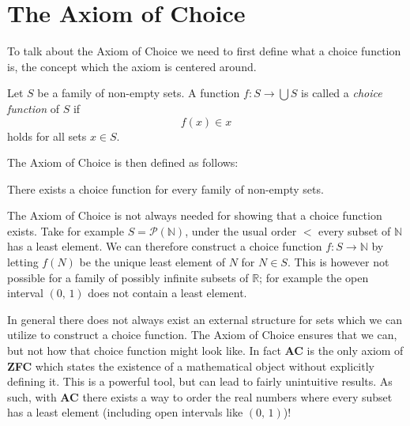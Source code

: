 \documentclass[../../main.tex]{subfiles}
\begin{document}
\section{The Axiom of Choice}
To talk about the Axiom of Choice we need to first define what a choice function is, the concept which the axiom is centered around.
\begin{definition}\cite[p.38]{Jec78}
    Let $S$ be a family of non-empty sets.
    A function $f: S \to \bigcup S$ is called a \textit{choice function} of $S$ if
    $$f(x) \in x$$
    holds for all sets $x \in S$.
\end{definition}
The Axiom of Choice is then defined as follows:
\begin{definition}\cite[p.38]{Jec78}\label{choice-axiom}
    There exists a choice function for every family of non-empty sets.
\end{definition}

The Axiom of Choice is not always needed for showing that a choice function exists.
Take for example $S = \mathcal{P}(\mathbb{N})$, under the usual order $<$ every subset of $\mathbb{N}$ has a least element.
We can therefore construct a choice function $f: S \to \mathbb{N}$ by letting $f(N)$ be the unique least element of $N$ for $N \in S$.
This is however not possible for a family of possibly infinite subsets of $\mathbb{R}$; for example the open interval $\left(0,\, 1\right)$ does not contain a least element.

In general there does not always exist an external structure for sets which we can utilize to construct a choice function.
The Axiom of Choice ensures that we can, but not how that choice function might look like.
In fact \textbf{AC} is the only axiom of \textbf{ZFC} which states the existence of a mathematical object without explicitly defining it.
This is a powerful tool, but can lead to fairly unintuitive results. 
As such, with \textbf{AC} there exists a way to order the real numbers where every subset has a least element (including open intervals like $\left(0,\, 1\right)$)!
\end{document}
